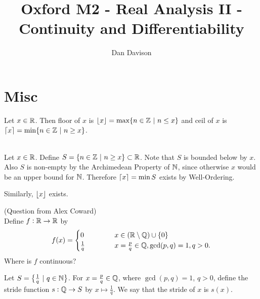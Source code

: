\documentclass[12pt]{article}
\begin{document}
\title{Oxford M2 - Real Analysis II - Continuity and Differentiability
  } \author{Dan Davison}
\author{}
\date{}
\maketitle


\section{Misc}
\newpage
\begin{definition*}
  Let $x \in \mathbb{R}$. Then floor of $x$ is $\lfloor x\rfloor = \max\{n \in \mathbb{Z} ~|~ n \leq x\}$ and ceil of $x$
  is $\lceil x\rceil = \min\{n \in \mathbb{Z} ~|~ n \geq x\}$.
\end{definition*}

\begin{theorem*}~\\
  Let $x \in \mathbb{R}$. Define $S = \{n \in \mathbb{Z} ~|~ n \geq x\} \subset \mathbb{R}$. Note that $S$ is bounded below
  by $x$. Also $S$ is non-empty by the Archimedean Property of $\mathbb{N}$, since otherwise $x$ would be
  an upper bound for $\mathbb{N}$. Therefore $\lceil x\rceil = \min S$ exists by Well-Ordering.

  Similarly, $\lfloor x\rfloor$ exists.
\end{theorem*}

\begin{mdframed}
  (Question from Alex Coward)\\

  Define $f:\mathbb{R}\to\mathbb{R}$ by
  \begin{align*}
    f(x) =
    \begin{cases}
      0 ~~~~~~~~~~  & x \in (\mathbb{R}\setminus\mathbb{Q})\cup\{0\}\\
     \frac{1}{q}    & x = \frac{p}{q} \in \mathbb{Q}, \gcd(p, q) = 1, q > 0.
    \end{cases}
  \end{align*}
  Where is $f$ continuous?
\end{mdframed}

\begin{definition*}[Stride]
  Let $S = \big\{\frac{1}{q} ~|~ q \in \mathbb{N}\big\}$. For $x = \frac{p}{q} \in \mathbb{Q}$, where
  $\gcd(p, q) = 1$, $q > 0$, define the stride function $s:\mathbb{Q}\to S$ by $x \mapsto \frac{1}{q}$. We
  say that the stride of $x$ is $s(x)$.
\end{definition*}

\end{document}
